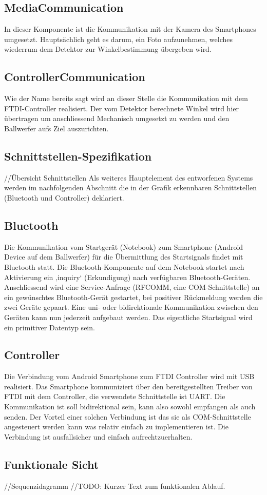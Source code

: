 		\subsection{MediaCommunication}
		In dieser Komponente ist die Kommunikation mit der Kamera des Smartphones umgesetzt. Hauptsächlich geht es darum, ein Foto aufzunehmen, welches wiederrum dem Detektor zur Winkelbestimmung übergeben wird.
		
		\subsection{ControllerCommunication}
		Wie der Name bereits sagt wird an dieser Stelle die Kommunikation mit dem FTDI-Controller realisiert. Der vom Detektor berechnete Winkel wird hier übertragen um anschliessend Mechanisch umgesetzt zu werden und den Ballwerfer aufs Ziel auszurichten.
		
	\subsection{Schnittstellen-Spezifikation}
		//Übersicht Schnittstellen
		Als weiteres Hauptelement des entworfenen Systems werden im nachfolgenden Abschnitt die in der Grafik erkennbaren Schnittstellen (Bluetooth und Controller) deklariert.
		
		\subsection{Bluetooth}
		Die Kommunikation vom Startgerät (Notebook) zum Smartphone (Android Device auf dem Ballwerfer) für die Übermittlung des Startsignals findet mit Bluetooth statt. Die Bluetooth-Komponente auf dem Notebook startet nach Aktivierung ein ‚inquiry‘ (Erkundigung) nach verfügbaren Bluetooth-Geräten. Anschliessend wird eine Service-Anfrage (RFCOMM, eine COM-Schnittstelle) an ein gewünschtes Bluetooth-Gerät gestartet, bei positiver Rückmeldung werden die zwei Geräte gepaart. Eine uni- oder bidirektionale Kommunikation zwischen den Geräten kann nun jederzeit aufgebaut werden. Das eigentliche Startsignal wird ein primitiver Datentyp sein.
		
		\subsection{Controller}
		Die Verbindung vom Android Smartphone zum FTDI Controller wird mit USB realisiert. 
		Das Smartphone kommuniziert über den bereitgestellten Treiber von FTDI mit dem Controller, die verwendete Schnittstelle ist UART. Die Kommunikation ist soll bidirektional sein, kann also sowohl empfangen als auch senden. Der Vorteil einer solchen Verbindung ist das sie als COM-Schnittstelle angesteuert werden kann was relativ einfach zu implementieren ist. Die Verbindung ist ausfallsicher und einfach aufrechtzuerhalten.		
		
	\subsection{Funktionale Sicht}
		//Sequenzidagramm
		//TODO: Kurzer Text zum funktionalen Ablauf.